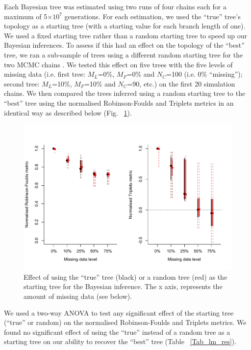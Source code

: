 Each Bayesian tree was estimated using two runs of four chains each for a maximum of 5$\times$$10^7$ generations.
For each estimation, we used the ``true'' tree's topology as a starting tree (with a starting value for each branch length of one).
We used a fixed starting tree rather than a random starting tree \citep[default MrBayes;][]{Ronquist2012mrbayes} to speed up our Bayesian inferences.
To assess if this had an effect on the topology of the ``best'' tree, we ran a sub-sample of trees using a different random starting tree for the two MCMC chains \citep[default MrBayes option;][]{Ronquist2012mrbayes}.
We tested this effect on five trees with the five levels of missing data (i.e. first tree: $M_L$=0\%, $M_F$=0\% and $N_C$=100 (i.e. 0\% ``missing''); second tree: $M_L$=10\%, $M_F$=10\% and $N_C$=90, etc.) on the first 20 simulation chains.
We then compared the trees inferred using a random starting tree to the ``best'' tree using the normalised Robinson-Foulds and Triplets metrics in an identical way as described below (Fig. ~\ref{Fig_startingTree}).

\begin{figure}[!htbp]
\centering
\includegraphics[keepaspectratio=true, width=\textwidth]{TEM/Figures/Starting_tree.pdf}
\caption{Effect of using the ``true'' tree (black) or a random tree (red) as the starting tree for the Bayesian inference. The x axis, represents the amount of missing data (see below).}
\label{Fig_startingTree}
\end{figure}

We used a two-way ANOVA to test any significant effect of the starting tree (``true'' or random) on the normalised Robinson-Foulds and Triplets metrics.
We found no significant effect of using the ``true'' instead of a random tree as a starting tree on our ability to recover the ``best'' tree (Table ~\ref{Tab_lm_res}).


